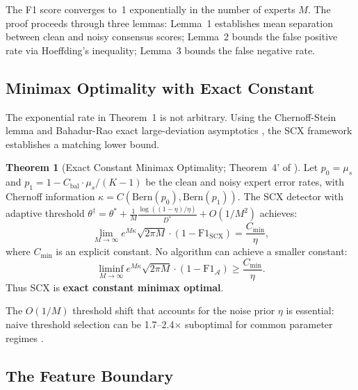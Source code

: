 \documentclass[twocolumn]{article}
\theoremstyle{definition}
\newtheorem{theorem}{Theorem}
\begin{document}
The F1 score converges to~1 exponentially in the number of experts $M$. The proof proceeds through three lemmas: Lemma~1 establishes mean separation between clean and noisy consensus scores; Lemma~2 bounds the false positive rate via Hoeffding's inequality; Lemma~3 bounds the false negative rate.

\subsection{Minimax Optimality with Exact Constant}

The exponential rate in Theorem~1 is not arbitrary. Using the Chernoff-Stein lemma and Bahadur-Rao exact large-deviation asymptotics \cite{bahadur1960, chernoff1952}, the SCX framework establishes a matching lower bound.

\begin{theorem}[Exact Constant Minimax Optimality; Theorem~4' of \cite{paperI}]
\label{thm:minimax}
Let $p_0 = \mu_s$ and $p_1 = 1 - C_{\text{bal}}\cdot\mu_s/(K-1)$ be the clean and noisy expert error rates, with Chernoff information $\kappa = C(\mathrm{Bern}(p_0), \mathrm{Bern}(p_1))$. The SCX detector with adaptive threshold $\theta^\dagger = \theta^* + \frac{1}{M}\frac{\log((1-\eta)/\eta)}{D^*} + O(1/M^2)$ achieves:
\begin{equation}
\lim_{M\to\infty} e^{M\kappa}\sqrt{2\pi M}\cdot(1-\mathrm{F1}_{\mathrm{SCX}}) = \frac{C_{\min}}{\eta},
\end{equation}
where $C_{\min}$ is an explicit constant. No algorithm can achieve a smaller constant:
\begin{equation}
\liminf_{M\to\infty} e^{M\kappa}\sqrt{2\pi M}\cdot(1-\mathrm{F1}_{\mathcal{A}}) \geq \frac{C_{\min}}{\eta}.
\end{equation}
Thus SCX is \textbf{exact constant minimax optimal}.
\end{theorem}

The $O(1/M)$ threshold shift that accounts for the noise prior $\eta$ is essential: naive threshold selection can be 1.7--2.4$\times$ suboptimal for common parameter regimes \cite{theorems_unified}.

\subsection{The Feature Boundary}
\end{document}
